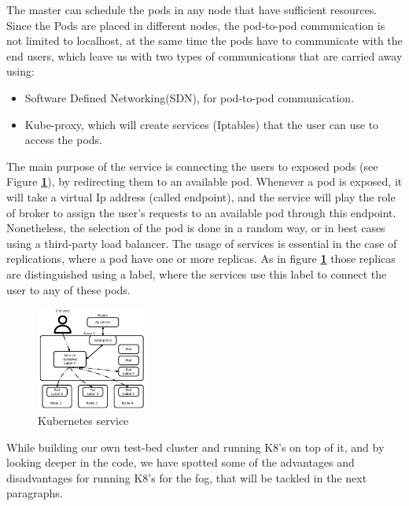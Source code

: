 \documentclass[letterpaper,twocolumn,10pt]{article}
\let\origref\ref
\def\ref#1{\textbf{\origref{#1}}}
\begin{document}
The master can schedule the pods in any node that have sufficient resources. Since the Pods are placed in different nodes, the pod-to-pod communication is not limited to localhost, at the same time the pods have to communicate with the end users, which leave us with two types of communications that are carried away using:

\begin{itemize}
	\item Software Defined Networking(SDN), for pod-to-pod communication.
	\item Kube-proxy, which will create services (Iptables) that the user can use to access the pods. 
\end{itemize}

The main purpose of the service is connecting the users to exposed pods (see Figure \ref{fig:svc}), by redirecting them to an available pod. Whenever a pod is exposed, it will take a virtual Ip address (called endpoint), and the service will play the role of broker to assign the user's requests to an available pod through this endpoint. Nonetheless, the selection of the pod is done in a random way, or in best cases using a third-party load balancer. The usage of services is essential in the case of replications, where a pod have one or more replicas. As in figure \ref{fig:svc} those replicas are distinguished using a label, where the services use this label to connect the user to any of these pods.    
\begin{figure}[t]
\centering\includegraphics[width=0.33\textwidth]{images/svc.png}
\caption{Kubernetes service}
\label{fig:svc}
\end{figure}

While building our own test-bed cluster and running K8's on top of it, and by looking deeper in the code, we have spotted some of the advantages and disadvantages for running K8's for the fog, that will be tackled in the next paragraphs.
\end{document}
